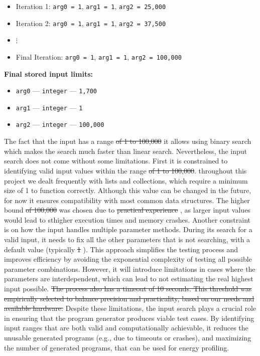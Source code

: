\begin{tcolorbox}
\begin{itemize}
    \item Iteration 1: \texttt{arg0 = 1}, \texttt{arg1 = 1}, \texttt{arg2 = 25,000}
    \item Iteration 2: \texttt{arg0 = 1}, \texttt{arg1 = 1}, \texttt{arg2 = 37,500}
    \item $\vdots$
    \item Final Iteration: \texttt{arg0 = 1}, \texttt{arg1 = 1}, \texttt{arg2 = 100,000}
\end{itemize}

\textbf{Final stored input limits:}
\begin{itemize}
    \item \texttt{arg0} — \texttt{integer} — \texttt{1,700}
    \item \texttt{arg1} — \texttt{integer} — \texttt{1}
    \item \texttt{arg2} — \texttt{integer} — \texttt{100,000}
\end{itemize}

\end{tcolorbox}


The fact that the input has a  range \st{of 1 to 100,000} it allows using binary search which makes the search much faster than linear search.
Nevertheless, the input search does not come without some limitations. First it is constrained to identifying valid input values within the range \st{of 1 to 100,000}.  throughout this project we dealt frequently with lists and collections, which require a minimum size of 1 to function correctly. Although this value can be changed in the future, for now it ensures compatibility with most common data structures. The higher bound \st{of 100,000}
 was chosen due to \st{practical experience} , as larger input values would lead to st{higher}  execution times and memory crashes. Another constraint is on how the input handles multiple parameter methods. During its search for a valid input, it needs to fix all the other parameters that is not searching, with a default value (typically \st{1} ). This approach simplifies the testing process and improves efficiency by avoiding the exponential complexity of testing all possible parameter combinations. However, it will introduce limitations in cases where the parameters are interdependent, which can lead to not estimating the real highest input possible. \st{The process also has a timeout of 10 seconds. This threshold was empirically selected to balance precision and practicality, based on our needs and available hardware.}
Despite these limitations, the input search plays a crucial role in ensuring that the program generator produces viable test cases. By identifying input ranges that are both valid and computationally achievable, it reduces the unusable generated programs (e.g., due to timeouts or crashes), and maximizing the number of generated programs, that can be used for energy profiling.



